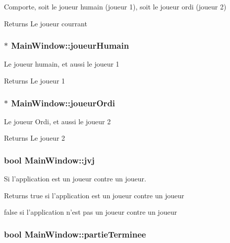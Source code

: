 Comporte, soit le joueur humain (joueur 1), soit le joueur ordi (joueur 2) \begin{DoxyReturn}{Returns}
Le joueur courrant 
\end{DoxyReturn}
\hypertarget{class_main_window_ac8503f9eb4259016c7858e59aa31c1a4}{
\subsubsection[{joueur\-Humain}]{$\ast$ Main\-Window\-::joueur\-Humain}}\label{class_main_window_ac8503f9eb4259016c7858e59aa31c1a4}
Le joueur humain, et aussi le joueur 1 \begin{DoxyReturn}{Returns}
Le joueur 1 
\end{DoxyReturn}
\hypertarget{class_main_window_acb5c1aad1ac317404027da04e4a175d3}{
\subsubsection[{joueur\-Ordi}]{$\ast$ Main\-Window\-::joueur\-Ordi}}\label{class_main_window_acb5c1aad1ac317404027da04e4a175d3}
Le joueur Ordi, et aussi le joueur 2 \begin{DoxyReturn}{Returns}
Le joueur 2 
\end{DoxyReturn}
\hypertarget{class_main_window_a8037ff2bca42ebb5858b0cebd5ef9bb7}{
\subsubsection[{jvj}]{\setlength{\rightskip}{0pt plus 5cm}bool Main\-Window\-::jvj}}\label{class_main_window_a8037ff2bca42ebb5858b0cebd5ef9bb7}


Si l'application est un joueur contre un joueur. 

\begin{DoxyReturn}{Returns}
true si l'application est un joueur contre un joueur 

false si l'application n'est pas un joueur contre un joueur 
\end{DoxyReturn}
\hypertarget{class_main_window_a00d26707b5d27cc6ce07479a46244692}{
\subsubsection[{partie\-Terminee}]{\setlength{\rightskip}{0pt plus 5cm}bool Main\-Window\-::partie\-Terminee}}\label{class_main_window_a00d26707b5d27cc6ce07479a46244692}


